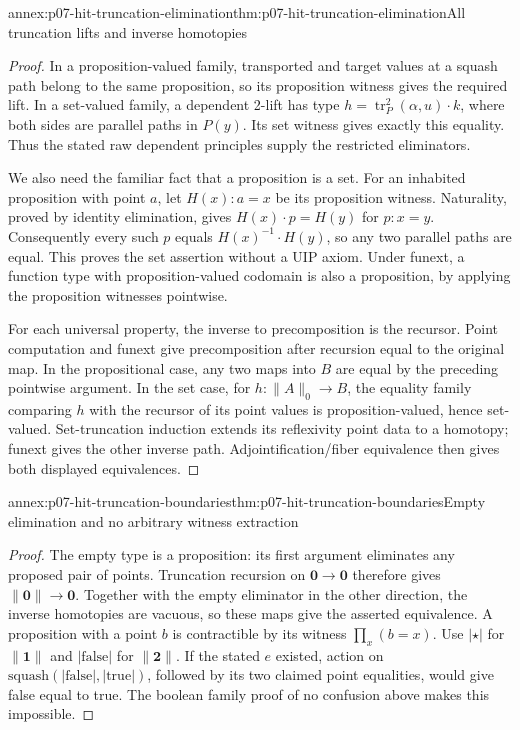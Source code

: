 \begin{annexitem}{annex:p07-hit-truncation-elimination}{thm:p07-hit-truncation-elimination}{All truncation lifts and inverse homotopies}
\begin{proof}
In a proposition-valued family, transported and target values at a squash
path belong to the same proposition, so its proposition witness gives
the required lift. In a set-valued family, a dependent 2-lift has type
\(h=\operatorname{tr}^2_P(\alpha,u)\cdot k\), where both sides are
parallel paths in \(P(y)\). Its set witness gives exactly this equality.
Thus the stated raw dependent principles supply the restricted eliminators.

We also need the familiar fact that a proposition is a set. For an inhabited
proposition with point \(a\), let \(H(x):a=x\) be its proposition
witness. Naturality, proved by identity elimination, gives
\(H(x)\cdot p=H(y)\) for \(p:x=y\). Consequently every such \(p\)
equals \(H(x)^{-1}\cdot H(y)\), so any two parallel paths are equal.
This proves the set assertion without a UIP axiom. Under funext, a function
type with proposition-valued codomain is also a proposition, by applying
the proposition witnesses pointwise.

For each universal property, the inverse to precomposition is the recursor.
Point computation and funext give precomposition after recursion equal to
the original map. In the propositional case, any two maps into \(B\)
are equal by the preceding pointwise argument. In the set case, for
\(h:\|A\|_0\to B\), the equality family comparing \(h\) with the
recursor of its point values is proposition-valued, hence set-valued.
Set-truncation induction extends its reflexivity point data to a homotopy;
funext gives the other inverse path. Adjointification/fiber equivalence
then gives both displayed equivalences.
\end{proof}
\end{annexitem}

\begin{annexitem}{annex:p07-hit-truncation-boundaries}{thm:p07-hit-truncation-boundaries}{Empty elimination and no arbitrary witness extraction}
\begin{proof}
The empty type is a proposition: its first argument eliminates any proposed
pair of points. Truncation recursion on \(\mathbf0\to\mathbf0\)
therefore gives \(\|\mathbf0\|\to\mathbf0\). Together with the empty
eliminator in the other direction, the inverse homotopies are vacuous, so
these maps give the asserted equivalence. A proposition with a point \(b\)
is contractible by its witness \(\prod_x(b=x)\). Use \(|\star|\) for
\(\|\mathbf1\|\) and \(|\mathrm{false}|\) for \(\|\mathbf2\|\).
If the stated \(e\) existed, action on
\(\mathrm{squash}(|\mathrm{false}|,|\mathrm{true}|)\), followed by its
two claimed point equalities, would give false equal to true. The boolean
family proof of no confusion above makes this impossible.
\end{proof}
\end{annexitem}

